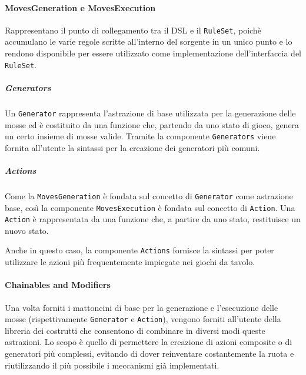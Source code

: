 
\paragraph{MovesGeneration e MovesExecution}
Rappresentano il punto di collegamento tra il DSL e il \texttt{RuleSet}, poichè accumulano le varie regole scritte all'interno del sorgente in un unico punto e lo rendono disponibile per essere utilizzato come implementazione dell'interfaccia del \texttt{RuleSet}.

\subparagraph{Generators}
Un \texttt{Generator} rappresenta l'astrazione di base utilizzata per la generazione delle mosse ed è costituito da una funzione che, partendo da uno stato di gioco, genera un certo insieme di mosse valide.
%
Tramite la componente \texttt{Generators} viene fornita all'utente la sintassi per la creazione dei generatori più comuni.

\subparagraph{Actions}
Come la \texttt{MovesGeneration} è fondata sul concetto di \texttt{Generator} come astrazione base, così la componente \texttt{MovesExecution} è fondata sul concetto di \texttt{Action}.
%
Una \texttt{Action} è rappresentata da una funzione che, a partire da uno stato, restituisce un nuovo stato.

Anche in questo caso, la componente \texttt{Actions} fornisce la sintassi per poter utilizzare le azioni più frequentemente impiegate nei giochi da tavolo.

\paragraph{Chainables and Modifiers}
Una volta forniti i mattoncini di base per la generazione e l'esecuzione delle mosse (rispettivamente \texttt{Generator} e \texttt{Action}), vengono forniti all'utente della libreria dei costrutti che consentono di combinare in diversi modi queste astrazioni.
%
Lo scopo è quello di permettere la creazione di azioni composite o di generatori più complessi, evitando di dover reinventare costantemente la ruota e riutilizzando il più possibile i meccanismi già implementati.

